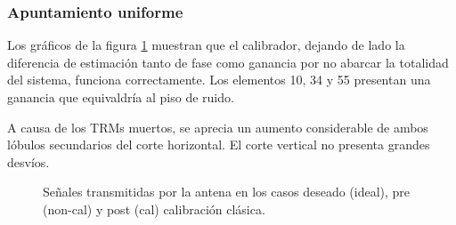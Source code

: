 \subsubsection{Apuntamiento uniforme}

Los gráficos de la figura \ref{fig:deadTRMsClassical0deg} muestran que el calibrador, dejando de lado la diferencia de 
estimación tanto de fase como ganancia por no abarcar la totalidad del sistema, funciona correctamente. Los elementos 10, 34 y 
55 presentan una ganancia que equivaldría al piso de ruido.

A causa de los TRMs muertos, se aprecia un aumento considerable de ambos lóbulos secundarios del corte horizontal. El corte 
vertical no presenta grandes desvíos.

\begin{figure}[H]
	\centering

	\caption{Señales transmitidas por la antena en los casos deseado (ideal), pre (non-cal) y post (cal) calibración clásica.}
	\label{fig:deadTRMsClassical0deg}
\end{figure}


